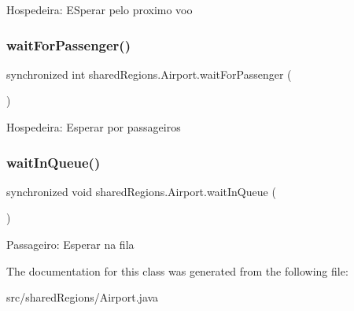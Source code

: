 Hospedeira\+: E\+Sperar pelo proximo voo \mbox{\label{classshared_regions_1_1_airport_af0a8b9670f4f72400f35a790990d96d2}} 
\subsubsection{\texorpdfstring{wait\+For\+Passenger()}{waitForPassenger()}}
{\footnotesize\ttfamily synchronized int shared\+Regions.\+Airport.\+wait\+For\+Passenger (\begin{DoxyParamCaption}{ }\end{DoxyParamCaption})\hspace{0.3cm}{\ttfamily [inline]}}

Hospedeira\+: Esperar por passageiros \mbox{\label{classshared_regions_1_1_airport_a96f0b64b0a1a814d9f9916a688af4477}} 
\subsubsection{\texorpdfstring{wait\+In\+Queue()}{waitInQueue()}}
{\footnotesize\ttfamily synchronized void shared\+Regions.\+Airport.\+wait\+In\+Queue (\begin{DoxyParamCaption}{ }\end{DoxyParamCaption})\hspace{0.3cm}{\ttfamily [inline]}}

Passageiro\+: Esperar na fila 

The documentation for this class was generated from the following file\+:\begin{DoxyCompactItemize}
\item 
src/shared\+Regions/Airport.\+java\end{DoxyCompactItemize}

